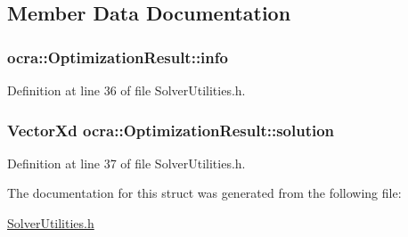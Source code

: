 \subsection{Member Data Documentation}
\subsubsection[{\texorpdfstring{info}{info}}]{ ocra\+::\+Optimization\+Result\+::info}\hypertarget{structocra_1_1OptimizationResult_ab422e9cee7b8996585676d61ca14499b}{}\label{structocra_1_1OptimizationResult_ab422e9cee7b8996585676d61ca14499b}


Definition at line 36 of file Solver\+Utilities.\+h.

\subsubsection[{\texorpdfstring{solution}{solution}}]{\setlength{\rightskip}{0pt plus 5cm}Vector\+Xd ocra\+::\+Optimization\+Result\+::solution}\hypertarget{structocra_1_1OptimizationResult_a5d0f76e8b3e5d517ba83a2ecd082f85b}{}\label{structocra_1_1OptimizationResult_a5d0f76e8b3e5d517ba83a2ecd082f85b}


Definition at line 37 of file Solver\+Utilities.\+h.



The documentation for this struct was generated from the following file\+:\begin{DoxyCompactItemize}
\item 
\hyperlink{SolverUtilities_8h}{Solver\+Utilities.\+h}\end{DoxyCompactItemize}
